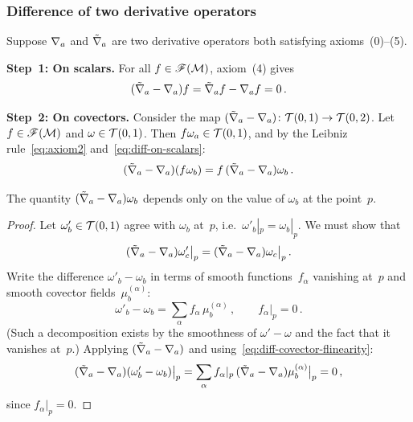 

\subsubsection{Difference of two derivative operators}%
\label{sec:difference-operators}

Suppose $\nabla_a$ and $\tilde{\nabla}_a$ are two derivative
operators both satisfying axioms~(0)--(5).

\medskip\noindent
\textbf{Step~1: On scalars.}\;
For all $f\in\mathscr{F}(\mathcal{M})$, axiom~(4) gives
\begin{equation}\label{eq:diff-on-scalars}
  (\tilde{\nabla}_a - \nabla_a)f
    = \tilde{\nabla}_a f - \nabla_a f = 0\,.
\end{equation}

\medskip\noindent
\textbf{Step~2: On covectors.}\;
Consider the map
$(\tilde{\nabla}_a - \nabla_a)\colon\mathcal{T}(0,1)\to\mathcal{T}(0,2)$.
Let $f\in\mathscr{F}(\mathcal{M})$ and $\omega\in\mathcal{T}(0,1)$.  Then
$f\omega_a\in\mathcal{T}(0,1)$, and by the Leibniz
rule~\eqref{eq:axiom2} and~\eqref{eq:diff-on-scalars}:
\begin{equation}\label{eq:diff-covector-flinearity}
  (\tilde{\nabla}_a - \nabla_a)(f\omega_b)
    = f\,(\tilde{\nabla}_a - \nabla_a)\omega_b\,.
\end{equation}

\begin{theorem}\label{thm:diff-local}
  The quantity $(\tilde{\nabla}_a - \nabla_a)\omega_b$
  depends only on the value of $\omega_b$ at the
  point~$p$.
\end{theorem}

\begin{proof}
  Let $\omega'_b\in\mathcal{T}(0,1)$ agree with $\omega_b$ at~$p$,
  i.e.\ $\omega'_b|_p = \omega_b|_p$.  We must show that
  \[
    (\tilde{\nabla}_a - \nabla_a)\omega'_c\big|_p
    = (\tilde{\nabla}_a - \nabla_a)\omega_c\big|_p\,.
  \]
  Write the difference $\omega'_b - \omega_b$ in terms of smooth
  functions~$f_\alpha$ vanishing at~$p$ and smooth covector
  fields~$\mu_b^{(\alpha)}$:
  \[
    \omega'_b - \omega_b
      = \sum_\alpha f_\alpha\, \mu_b^{(\alpha)}\,,
    \qquad f_\alpha|_p = 0\,.
  \]
  (Such a decomposition exists by the smoothness of
  $\omega' - \omega$ and the fact that it vanishes at~$p$.)
  Applying $(\tilde{\nabla}_a - \nabla_a)$ and
  using~\eqref{eq:diff-covector-flinearity}:
  \[
    (\tilde{\nabla}_a - \nabla_a)(\omega'_b - \omega_b)\big|_p
    = \sum_\alpha
      f_\alpha|_p\,
      (\tilde{\nabla}_a - \nabla_a)\mu_b^{(\alpha)}\big|_p
    = 0\,,
  \]
  since $f_\alpha|_p = 0$.
\end{proof}


